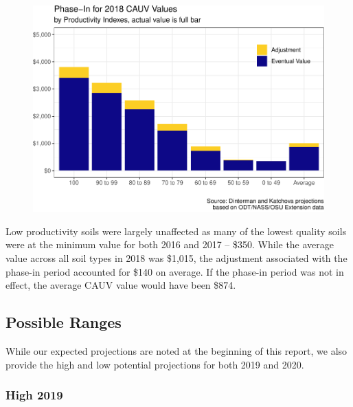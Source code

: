 \documentclass[]{article}
\begin{document}
\begin{figure}[H]
\includegraphics[width=1\linewidth]{4-projections-2019-2020_files/figure-latex/phase-in-1} \caption{\label{fig:phase-in}}\label{fig:phase-in}
\end{figure}

Low productivity soils were largely unaffected as many of the lowest
quality soils were at the minimum value for both 2016 and 2017 -- \$350.
While the average value across all soil types in 2018 was \$1,015, the
adjustment associated with the phase-in period accounted for \$140 on
average. If the phase-in period was not in effect, the average CAUV
value would have been \$874.

\hypertarget{possible-ranges}{%
\subsection{Possible Ranges}\label{possible-ranges}}

While our expected projections are noted at the beginning of this
report, we also provide the high and low potential projections for both
2019 and 2020.

\hypertarget{high-2019}{%
\subsubsection{High 2019}\label{high-2019}}
\end{document}
